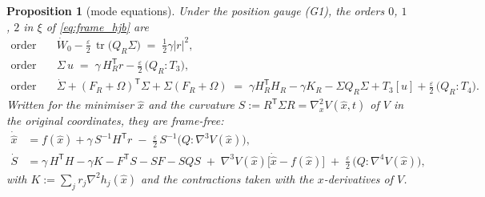 \documentclass[11pt,a4paper]{article}
\newcommand{\tr}{\operatorname{tr}}
\newcommand{\T}{^{\mathsf T}}
\newcommand{\xh}{\hat{x}}
\newcommand{\eps}{\varepsilon}
\newcommand{\abs}[1]{\left\lvert #1 \right\rvert}
\newcommand{\grad}{\nabla}
\theoremstyle{plain}
\newtheorem{proposition}{Proposition}
\theoremstyle{definition}
\theoremstyle{remark}
\begin{document}
\begin{proposition}[mode equations]
\label{prop:frame_mode}
Under the position gauge (G1), the orders $0$, $1$, $2$ in $\xi$ of \eqref{eq:frame_hjb} are
\begin{align}
  \text{order 0:}\quad & \dot W_0 - \frac\eps2\,\tr\big(Q_R\Sigma\big) \;=\; \tfrac12\gamma\abs r^2, \label{eq:frame_o0}\\
  \text{order 1:}\quad & \Sigma\,u \;=\; \gamma\,H_R\T r - \frac\eps2\,\big(Q_R\!:\!T_3\big), \label{eq:frame_o1}\\
  \text{order 2:}\quad & \dot\Sigma + (F_R+\Omega)\T\Sigma + \Sigma(F_R+\Omega) \;=\; \gamma H_R\T H_R - \gamma K_R - \Sigma Q_R\Sigma + T_3[u] + \frac\eps2\,\big(Q_R\!:\!T_4\big). \label{eq:frame_o2}
\end{align}
Written for the minimiser $\xh$ and the curvature $S := R\T\Sigma R = \grad_x^2V(\xh,t)$ of $V$ in the original coordinates, they are frame-free:
\begin{align}
  \dot{\xh} &= f(\xh) + \gamma\,S^{-1}H\T r \;-\; \frac\eps2\,S^{-1}\big(Q\!:\!\grad^3V(\xh)\big), \label{eq:frame_xhat}\\
  \dot S &= \gamma\,H\T H - \gamma K - F\T S - SF - SQS \;+\; \grad^3V(\xh)\big[\dot{\xh}-f(\xh)\big] \;+\; \frac\eps2\,\big(Q\!:\!\grad^4V(\xh)\big), \label{eq:frame_S}
\end{align}
with $K := \sum_jr_j\grad^2h_j(\xh)$ and the contractions taken with the $x$-derivatives of $V$.
\end{proposition}
\end{document}
